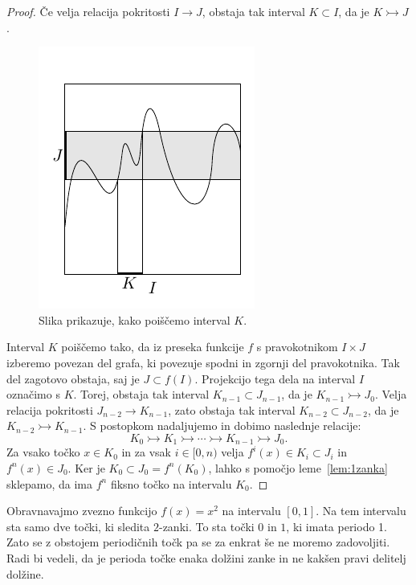\documentclass[mat2]{fmfdelo}
\begin{document}
\begin{proof}
Če velja relacija pokritosti $I \to J$, obstaja tak interval $K \subset I$, da je $K \rightarrowtail J$.
\begin{figure}[h]
  \centering
  \includegraphics[]{images/bezje.pdf}
  \caption[Primer vektorske slike.]{Slika prikazuje, kako poiščemo interval $K$.}
  \label{fig:bezje}
\end{figure}
Interval $K$ poiščemo tako, da iz preseka funkcije $f$ s pravokotnikom $I \times J$ izberemo povezan del grafa, ki povezuje spodni in zgornji del pravokotnika. Tak del zagotovo obstaja, saj je $J \subset f(I)$. Projekcijo tega dela na interval $I$ označimo s $K$. Torej, obstaja tak interval $K_{n-1} \subset J_{n-1}$, da je $K_{n-1} \rightarrowtail J_0$. Velja relacija pokritosti $J_{n-2} \to K_{n-1}$, zato obstaja tak interval $K_{n-2} \subset J_{n-2}$, da je $K_{n-2} \rightarrowtail K_{n-1}$. S postopkom nadaljujemo in dobimo naslednje relacije:
$$K_0 \rightarrowtail K_1 \rightarrowtail \cdots \rightarrowtail K_{n-1} \rightarrowtail J_0.$$
Za vsako točko $x \in K_0$ in za vsak $i \in [0, n)$ velja $f^i(x) \in K_i \subset J_i$ in $f^n(x) \in J_0$. Ker je $K_0 \subset J_0 = f^n(K_0)$, lahko s pomočjo leme~\ref{lem:1zanka} sklepamo, da ima $f^n$ fiksno točko na intervalu $K_0$.
\end{proof}

Obravnavajmo zvezno funkcijo $f(x) = x^2$ na intervalu $[0, 1]$. Na tem intervalu sta samo dve točki, ki sledita $2$-zanki. To sta točki $0$ in $1$, ki imata periodo 1.
Zato se z obstojem periodičnih točk pa se za enkrat še ne moremo zadovoljiti. Radi bi vedeli, da je perioda točke enaka dolžini zanke in ne kakšen pravi delitelj dolžine.
\end{document}
